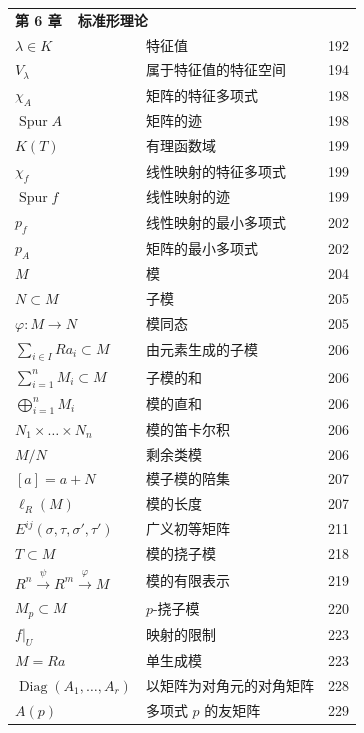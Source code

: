 \begin{longtable}{@{}l l r}
\multicolumn{3}{l}{\textbf{第 6 章\ \ 标准形理论}} \\[2pt]
$\lambda \in K$ & 特征值 & 192 \\
$V_\lambda$ & 属于特征值的特征空间 & 194 \\
$\chi_A$ & 矩阵的特征多项式 & 198 \\
$\operatorname{Spur} A$ & 矩阵的迹 & 198 \\
$K(T)$ & 有理函数域 & 199 \\
$\chi_f$ & 线性映射的特征多项式 & 199 \\
$\operatorname{Spur} f$ & 线性映射的迹 & 199 \\
$p_f$ & 线性映射的最小多项式 & 202 \\
$p_A$ & 矩阵的最小多项式 & 202 \\
$M$ & 模 & 204 \\
$N \subset M$ & 子模 & 205 \\
$\varphi \colon M \longrightarrow N$ & 模同态 & 205 \\
$\sum_{i \in I} Ra_i \subset M$ & 由元素生成的子模 & 206 \\
$\sum_{i = 1}^{n} M_i \subset M$ & 子模的和 & 206 \\
$\bigoplus_{i = 1}^{n} M_i$ & 模的直和 & 206 \\
$N_1 \times \ldots \times N_n$ & 模的笛卡尔积 & 206 \\
$M / N$ & 剩余类模 & 206 \\
$[a] = a + N$ & 模子模的陪集 & 207 \\
$\ell_R(M)$ & 模的长度 & 207 \\
$E^{ij}(\sigma, \tau, \sigma', \tau')$ & 广义初等矩阵 & 211 \\
$T \subset M$ & 模的挠子模 & 218 \\
$R^n \xrightarrow{\psi} R^m \xrightarrow{\varphi} M$ & 模的有限表示 & 219 \\
$M_p \subset M$ & $p$-挠子模 & 220 \\
$f|_U$ & 映射的限制 & 223 \\
$M = Ra$ & 单生成模 & 223 \\
$\operatorname{Diag}(A_1, \ldots, A_r)$ & 以矩阵为对角元的对角矩阵 & 228 \\
$A(p)$ & 多项式 $p$ 的友矩阵 & 229 \\
\hline


\end{longtable}
